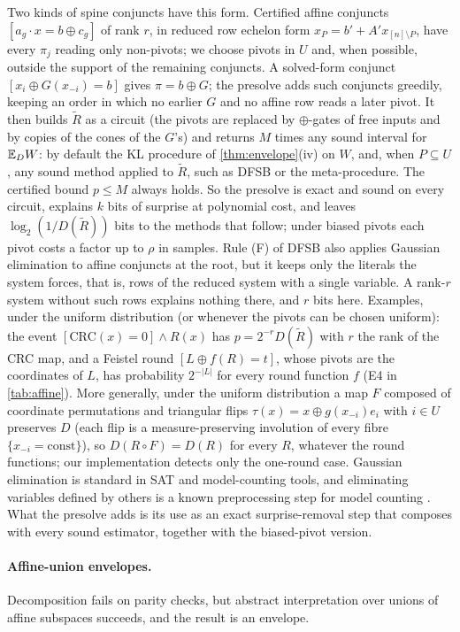 Two kinds of spine conjuncts have this form. Certified affine conjuncts
$[a_g\cdot x=b\oplus c_g]$ of rank $r$, in reduced row echelon form
$x_P=b'+A'x_{[n]\setminus P}$, have every $\pi_j$ reading only non-pivots; we choose
pivots in $U$ and, when possible, outside the support of the remaining conjuncts. A
solved-form conjunct $[x_i\oplus G(x_{-i})=b]$ gives $\pi=b\oplus G$; the presolve
adds such conjuncts greedily, keeping an order in which no earlier $G$ and no affine
row reads a later pivot. It then builds $\tilde R$ as a circuit (the pivots are
replaced by $\oplus$-gates of free inputs and by copies of the cones of the $G$'s) and
returns $M$ times any sound interval for $\mathbb{E}_DW$: by default the KL procedure of
\cref{thm:envelope}(iv) on $W$, and, when $P\subseteq U$, any sound method applied to
$\tilde R$, such as DFSB or the meta-procedure. The certified bound $p\le M$ always
holds. So the presolve is exact and sound on every circuit, explains $k$ bits of
surprise at polynomial cost, and leaves $\log_2(1/D(\tilde R))$ bits to the methods
that follow; under biased pivots each pivot costs a factor up to $\rho$ in samples.
Rule (F) of DFSB also applies Gaussian elimination to affine conjuncts at the root,
but it keeps only the literals the system forces, that is, rows of the reduced system
with a single variable. A rank-$r$ system without such rows explains nothing there,
and $r$ bits here. Examples, under the uniform distribution (or whenever the pivots can
be chosen uniform): the event $[\mathrm{CRC}(x)=0]\wedge R(x)$ has
$p=2^{-r}D(\tilde R)$ with $r$ the rank of the CRC map, and a Feistel round $[L\oplus f(R)=t]$,
whose pivots are the coordinates of $L$, has probability $2^{-|L|}$ for every round
function $f$ (E4 in \cref{tab:affine}). More
generally, under the uniform distribution a map $F$ composed of coordinate
permutations and triangular flips
$\tau(x)=x\oplus g(x_{-i})e_i$ with $i\in U$ preserves $D$ (each flip is a
measure-preserving involution of every fibre $\{x_{-i}=\text{const}\}$), so
$D(R\circ F)=D(R)$ for every $R$, whatever the round functions; our implementation
detects only the one-round case. Gaussian elimination is standard in SAT and
model-counting tools, and eliminating variables defined by others is a known
preprocessing step for model counting \cite{lagniez2016}. What the presolve adds is
its use as an exact surprise-removal step that composes with every sound estimator,
together with the biased-pivot version.

\paragraph{Affine-union envelopes.}
Decomposition fails on parity checks, but abstract interpretation over unions of
affine subspaces succeeds, and the result is an envelope.

